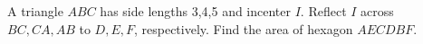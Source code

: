 A triangle $ABC$ has side lengths 3,4,5 and incenter $I$. Reflect $I$ across $BC,CA,AB$ to $D,E,F$, respectively. Find the area of hexagon $AECDBF$.
